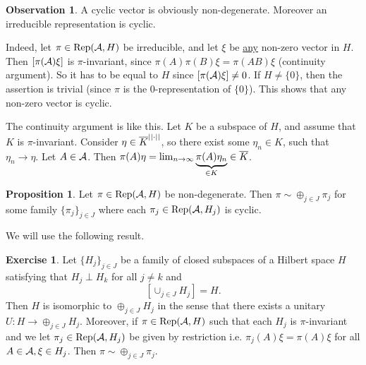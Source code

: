 \documentclass[10pt,english,a4paper]{article}
\theoremstyle{definition}
\newtheorem*{proposition}{Proposition}
\newtheorem*{observation}{Observation}
\newtheorem*{exercise}{Exercise}
\DeclareMathOperator{\Rep}{Rep}
\begin{document}
\begin{observation}
    A cyclic vector is obviously non-degenerate. Moreover an irreducible
representation is cyclic. 

Indeed, let $\pi \in \Rep(\As, H)$ be irreducible,
and let $\xi$ be \ul{any} non-zero vector in $H$.  Then $[\pi(\mathcal{A})\xi]$ is
$\pi$-invariant, since $\pi(A)\pi(B) \xi = \pi(AB)\xi$ (continuity argument).  So
it has to be equal to $H$ since $[\pi(\mathcal{A})\xi]\neq 0$. If $H\neq \{0\}$, then
the assertion is trivial (since $\pi$ is the $0$-representation of $\{0\}$).
This shows that any non-zero vector is cyclic. 

The continuity argument is like this. Let $K$ be a subspace of $H$, and 
assume that $K$ is $\pi$-invariant. Consider $\eta \in \overline{K}^{||\cdot||}$,
so there exist some $\eta_n \in K$, such that $\eta_n\to \eta$. 
Let $A \in \mathcal{A}$. Then $\pi(A)\eta = \lim_{n\to\infty} \underbrace{\pi(A)\eta_n}_{\in K} \in \overline{K}$.
\end{observation}

\begin{proposition}
Let $\pi \in \Rep(\As,H)$ be non-degenerate. Then $\pi \sim \oplus_{j\in J}\pi_j$
for some family $\{\pi_j\}_{j\in J}$ where each $\pi_j \in \Rep(\As,H_j)$ is cyclic.
\end{proposition}
We will use the following result.
\begin{exercise}
Let $\{H_j\}_{j\in J}$ be a family of closed subspaces of a Hilbert space $H$
satisfying that $H_j \perp H_k$ for all $j\neq k$ and 
\[ \left[ \cup_{j\in J}H_j \right] = H. \]
Then $H$ is isomorphic to $\oplus_{j\in J} H_j$ in the sense that there exists a
unitary $U \colon H \to \oplus_{j\in J} H_j$. Moreover, if 
$\pi \in \Rep(\As,H)$ such that each $H_j$ is $\pi$-invariant and we let
$\pi_j\in \Rep(\As,H_j)$ be given by restriction i.e.
$\pi_j(A)\xi = \pi(A)\xi$ for all $A\in \mathcal{A}, \xi\in H_j$.
Then $\pi \sim \oplus_{j\in J}\pi_j$.
\end{exercise}
\end{document}

